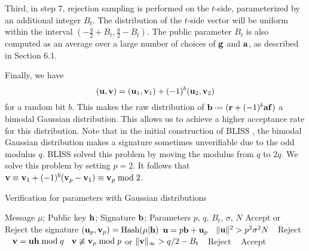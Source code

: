 \documentclass{llncs}
\newcommand{\bfa}{{\bf a}}
\newcommand{\bfb}{{\bf b}}
\newcommand{\bff}{{\bf f}}
\newcommand{\bfg}{{\bf g}}
\newcommand{\bfh}{{\bf h}}
\newcommand{\bfr}{{\bf r}}
\newcommand{\bfu}{{\bf u}}
\newcommand{\bfv}{{\bf v}}
\newcommand{\<}{\langle}
\renewcommand{\>}{\rangle}
\newcommand*{\defeq}{\mathrel{\vcenter{\baselineskip0.5ex \lineskiplimit0pt
                     \hbox{\scriptsize.}\hbox{\scriptsize.}}}%
                     =}
\newcommand{\LineIf}[2]{ \STATE \algorithmicif\ {#1}\ \algorithmicthen\ {#2} \algorithmicend\ \algorithmicif }
\begin{document}
Third, in step $7$,
rejection sampling is performed on the $t$-side, parameterized by an additional 
integer $B_t$. The distribution of the $t$-side
vector will be uniform within the interval $(-\frac{q}{2}+B_t, \frac{q}{2}-B_t)$.   The public parameter $B_t$ is also computed as an average over a large number of choices of $\bfg$ and $\bfa$, as described in Section 6.1.

Finally,  we have 
\[(\bfu,\bfv) = (\bfu_1, \bfv_1) + (-1)^b(\bfu_2, \bfv_2)\]
for a random bit $b$.
This makes the raw distribution of $\bfb \defeq (\bfr+(-1)^b\bfa\bff) $
a bimodal Gaussian distribution. 
This allows us to achieve a higher acceptance rate for this distribution.
Note that in the initial construction of BLISS \cite{DBLP:conf/crypto/DucasDLL13}, the bimodal Gaussian distribution makes a signature sometimes unverifiable due to the odd modulus $q$. BLISS
solved this problem by moving the modulus from $q$ to $2q$. 
We solve this problem by setting $p = 2$.
It follows that
$\bfv \equiv \bfv_1 + (-1)^b(\bfv_p - \bfv_1)\equiv
\bfv_p  \bmod 2$.
\begin{algorithm}
\caption{Verification for parameters with  Gaussian distributions}
\begin{algorithmic}[1]
\REQUIRE Message $\mu$; Public key $\bfh$; Signature $\bfb$; Parameters $p$, $q$, $B_t$, $\sigma$, $N$
\ENSURE Accept or Reject the signature
\STATE $(\bfu_p,\bfv_p)= \text{Hash}(\mu|\bfh)$
\STATE $\bfu = p\bfb + \bfu_p$
\LineIf {$\|\bfu\|^2>p^2\sigma^2N$} {Reject}
\STATE
$\bfv = \bfu\bfh \bmod q$
\LineIf {$\bfv\not\equiv \bfv_p \bmod p$ or $\| \bfv\|_\infty >q/2 - B_t$} {Reject}
\RETURN Accept
\end{algorithmic}
\end{algorithm}
\end{document}
